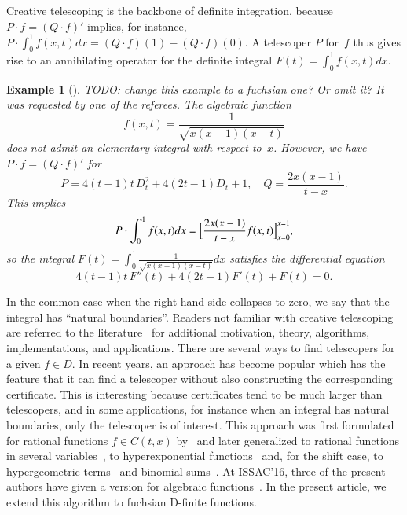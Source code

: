 \documentclass[final,1p,times,authoryear]{elsarticle}
\newtheorem{example}[theorem]{Example}
\newcommand{\red}{\color{red}}
\newcommand{\todo}[1]{{\red TODO: #1}}
\begin{document}
Creative telescoping is the backbone of definite integration, because
$P\cdot f=(Q\cdot f)'$ implies, for instance, $P\cdot\int_0^1 f(x,t)dx = (Q\cdot f)(1) - (Q\cdot f)(0)$.
A telescoper $P$ for~$f$ thus gives rise to an annihilating operator for the
definite integral $F(t)=\int_0^1 f(x,t)dx$.
\begin{example}[\citep{manin1958}]
  \todo{change this example to a fuchsian one? Or omit it? It was requested by one of the referees.}
  The algebraic function
  \[
    f(x,t)=\frac1{\sqrt{x(x-1)(x-t)}}
  \]
  does not admit an elementary integral with respect to~$x$.
  However, we have $P\cdot f=(Q\cdot f)'$ for
  \[
    P=4(t-1)t\,D_t^2 + 4(2t-1)D_t+1,\quad Q=\frac{2x(x-1)}{t-x}.
  \]
  This implies
  \[
    P\cdot \int_0^1 f(x,t)dx = \Bigl[\frac{2x(x-1)}{t-x}f(x,t)\Bigr]_{x=0}^{x=1},
  \]
  so the integral $F(t)=\int_0^1\frac1{\sqrt{x(x-1)(x-t)}}dx$ satisfies the differential equation
  \[
    4(t-1)t\,F''(t) + 4(2t-1)F'(t) + F(t) = 0.
  \]
\end{example}
In the common case when the right-hand side
collapses to zero, we say that the integral has ``natural boundaries''. Readers not
familiar with creative telescoping are referred to the
literature~\citep{PWZbook1996,Zeilberger1990c,Zeilberger1991,Zeilberger1990,Koepf1998,kauers11}
for additional motivation, theory, algorithms, implementations, and applications. There are
several ways to find telescopers for a given $f\in D$. In recent years, an
approach has become popular which has the feature that it can find a telescoper
without also constructing the corresponding certificate. This is interesting
because certificates tend to be much larger than telescopers, and in some
applications, for instance when an integral has natural boundaries, only the telescoper is of interest. This approach was first
formulated for rational functions $f\in C(t,x)$ by~\cite{BCCL2010} and later
generalized to rational functions in several variables~\citep{bostan13,lairez16}, to
hyperexponential functions~\citep{bostan13a} and, for the shift case, to hypergeometric
terms~\citep{chen15a,huang16} and binomial sums~\citep{bostan16}.
At ISSAC'16, three of the present authors have given a version for algebraic functions~\citep{chen16}.
In the present article, we extend this algorithm to fuchsian D-finite functions.
\end{document}
